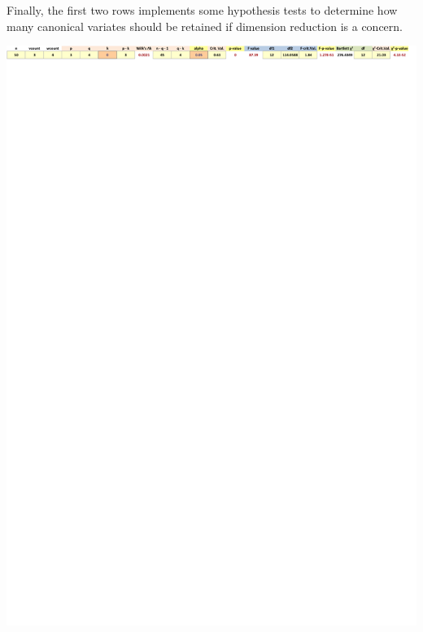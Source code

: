 \documentclass[article]{jss}
\begin{document}
        Finally, the first two rows implements some hypothesis tests to determine how many canonical variates should be retained if dimension reduction is a concern.
        \begin{center}
          \vspace{-10pt}\includegraphics[width=\linewidth, keepaspectratio=true]{img/CanCorrSheetHypothesisTests}
        \end{center}
        
        
        
        
        
\end{document}
